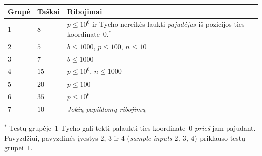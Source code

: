 \medskip
\begin{tabular}{lll}
Grupė & Taškai & Ribojimai \\\hline
  $1$ & $8$  & $p\leq 10^6$ ir Tycho nereikės laukti \emph{pajudėjus} iš pozicijos ties koordinate~$0$.$^*$ \\ %
  $2$ & $5$  & $b\leq 1000$, $p\leq 100$, $n\leq 10$ \\
  $3$ & $7$  & $b\leq 1000$ \\
  $4$ & $15$ & $p\leq 10^6$, $n\leq 1000$\\
  $5$ & $20$ & $p\leq 100$\\
  $6$ & $35$ & $p\leq 10^6$\\
  $7$ & $10$ & \emph{Jokių papildomų ribojimų}
\end{tabular}

\medskip
\noindent $^*$ Testų grupėje~$1$ Tycho gali tekti palaukti ties koordinate~$0$ \emph{prieš} jam pajudant.
Pavyzdžiui, pavyzdinės įvestys $2$, $3$ ir $4$ (\emph{sample inputs $2$, $3$, $4$}) priklauso testų grupei~$1$.
